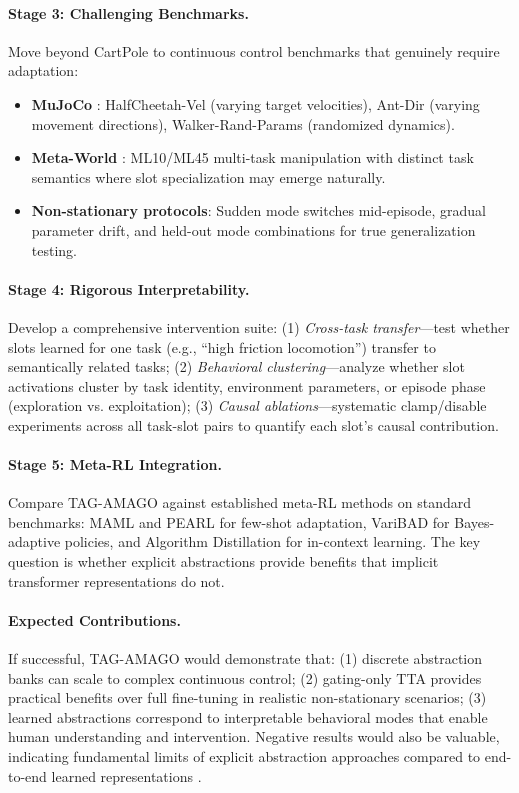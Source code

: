 \documentclass{article}
\begin{document}
\paragraph{Stage 3: Challenging Benchmarks.} Move beyond CartPole to continuous control benchmarks that genuinely require adaptation:
\begin{itemize}
    \item \textbf{MuJoCo} \citep{todorov2012mujoco}: HalfCheetah-Vel (varying target velocities), Ant-Dir (varying movement directions), Walker-Rand-Params (randomized dynamics).
    \item \textbf{Meta-World} \citep{yu2020meta}: ML10/ML45 multi-task manipulation with distinct task semantics where slot specialization may emerge naturally.
    \item \textbf{Non-stationary protocols}: Sudden mode switches mid-episode, gradual parameter drift, and held-out mode combinations for true generalization testing.
\end{itemize}

\paragraph{Stage 4: Rigorous Interpretability.} Develop a comprehensive intervention suite: (1) \emph{Cross-task transfer}---test whether slots learned for one task (e.g., ``high friction locomotion'') transfer to semantically related tasks; (2) \emph{Behavioral clustering}---analyze whether slot activations cluster by task identity, environment parameters, or episode phase (exploration vs. exploitation); (3) \emph{Causal ablations}---systematic clamp/disable experiments across all task-slot pairs to quantify each slot's causal contribution.

\paragraph{Stage 5: Meta-RL Integration.} Compare TAG-AMAGO against established meta-RL methods on standard benchmarks: MAML \citep{finn2017maml} and PEARL \citep{rakelly2019efficient} for few-shot adaptation, VariBAD \citep{zintgraf2020varibad} for Bayes-adaptive policies, and Algorithm Distillation \citep{laskin2022context} for in-context learning. The key question is whether explicit abstractions provide benefits that implicit transformer representations do not.

\paragraph{Expected Contributions.} If successful, TAG-AMAGO would demonstrate that: (1) discrete abstraction banks can scale to complex continuous control; (2) gating-only TTA provides practical benefits over full fine-tuning in realistic non-stationary scenarios; (3) learned abstractions correspond to interpretable behavioral modes that enable human understanding and intervention. Negative results would also be valuable, indicating fundamental limits of explicit abstraction approaches compared to end-to-end learned representations \citep{bengio2013representation}.
\end{document}
